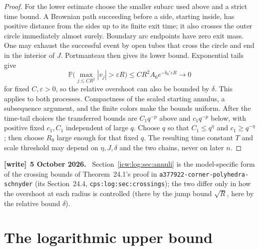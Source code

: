 \documentclass[11pt,letterpaper]{article}
\theoremstyle{remark}\newtheorem{remark}[theorem]{Remark}
\newcommand{\eps}{\varepsilon}
\newcommand{\Prob}{\mathbb P}
\newcommand{\1}{\mathbf1}
\newenvironment{writenote}[1][]{\par\smallskip\begingroup\small
 \noindent\textbf{[write]}\if\relax\detokenize{#1}\relax\else~\textbf{#1.}\fi\ }%
 {\par\endgroup\smallskip}
\newcommand{\file}[1]{\textup{\nolinkurl{#1}}}
\begin{document}
\begin{proof}
For the lower estimate choose the smaller subarc used above and a
strict time bound. A Brownian path succeeding before a side, starting
inside, has positive distance from the sides up to its finite exit time;
it also crosses the outer circle immediately almost surely. Boundary
arc endpoints have zero exit mass. One may exhaust the successful event
by open tubes that cross the circle and end in the interior of $J$.
Portmanteau then gives its lower bound. Exponential tails give
\[
 \Prob\bigl(\max_{j\le CR^2}|v_j|>\eps R\bigr)
       \le CR^2A_0e^{-b_0'\eps R}\longrightarrow0
\]
for fixed $C,\eps>0$, so the relative overshoot can also be bounded by
$\delta$. This applies to both processes. Compactness of the scaled
starting annulus, a subsequence argument, and the finite colors make
the bounds uniform. After the time-tail choices the transferred bounds
are $C_1q^{-p}$ above and $c_1q^{-p}$ below, with positive fixed
$c_1,C_1$ independent of large $q$. Choose $q$ so that
$C_1\le q^\eta$ and $c_1\ge q^{-\eta}$; then choose $R_0$ large enough
for that fixed $q$. The resulting time constant $T$ and scale threshold
may depend on $\eta,J,\delta$ and the two chains, never on later $n$.
\end{proof}
\begin{writenote}[5 October 2026]
Section~\ref{icw:log:sec:annuli} is the model-specific form of the crossing bounds of Theorem~24.1's proof in \file{a377922-corner-polyhedra-schnyder} (its Section~24.4, \texttt{cps:log:sec:crossings}); the two differ only in how the overshoot at each radius is controlled (there by the jump bound $\sqrt R$, here by the relative bound $\delta$).
\end{writenote}

\section{The logarithmic upper bound}\label{icw:log:sec:upper}
\end{document}

